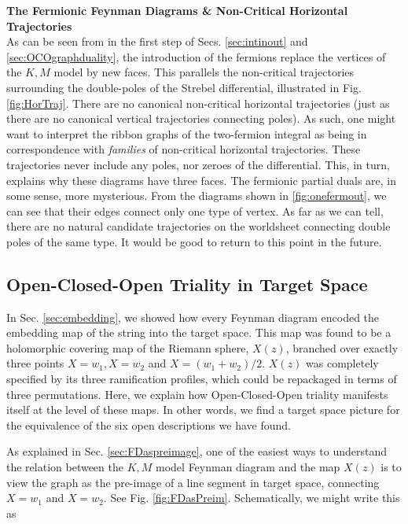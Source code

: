 \documentclass[english]{article}
\renewcommand{\>}{\rangle}
\newcommand{\<}{\langle}
\renewcommand{\(}{\left(}
\renewcommand{\)}{\right)}
\begin{document}
\textbf{The Fermionic Feynman Diagrams \& Non-Critical Horizontal Trajectories}\\
As can be seen from in the first step of Secs. \ref{sec:intinout} and \ref{sec:OCOgraphduality}, the introduction of the fermions replace the vertices of the $K,M$ model by new faces. This parallels the non-critical trajectories surrounding the double-poles of the Strebel differential, illustrated in Fig. \ref{fig:HorTraj}. There are no canonical non-critical horizontal trajectories (just as there are no canonical vertical trajectories connecting poles). As such, one might want to interpret the ribbon graphs of the two-fermion integral as being in correspondence with \textit{families} of non-critical horizontal trajectories. These trajectories never include any poles, nor zeroes of the differential. This, in turn, explains why these diagrams have three faces. The fermionic partial duals are, in some sense, more mysterious. From the diagrams shown in \ref{fig:onefermout}, we can see that their edges connect only one type of vertex. As far as we can tell, there are no natural candidate trajectories on the worldsheet connecting double poles of the same type. It would be good to return to this point in the future. 









\subsection{Open-Closed-Open Triality in Target Space}\label{sec:OCOinTS}

In Sec. \ref{sec:embedding}, we showed how every Feynman diagram encoded the embedding map of the string into the target space. This map was found to be a holomorphic covering map of the Riemann sphere, $X(z)$, branched over exactly three points $X=w_1, X=w_2$ and $X=(w_1+w_2)/2$. $X(z)$ was completely specified by its three ramification profiles, which could be repackaged in terms of three permutations. Here, we explain how Open-Closed-Open triality manifests itself at the level of these maps. In other words, we find a target space picture for the equivalence of the six open descriptions we have found. 

As explained in Sec. \ref{sec:FDaspreimage}, one of the easiest ways to understand the relation between the $K,M$ model Feynman diagram and the map $X(z)$ is to view the graph as the pre-image of a line segment in target space, connecting $X=w_1$ and $X=w_2$. See Fig. \ref{fig:FDasPreim}.  Schematically, we might write this as 
\end{document}
